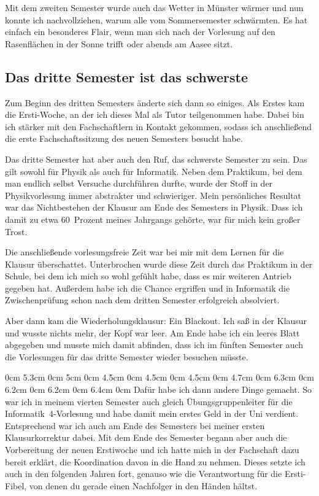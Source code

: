 \begin{multicols*}{2}
Mit dem zweiten Semester wurde auch das Wetter in Münster wärmer und nun konnte ich nachvollziehen, warum alle vom Sommersemester schwärmten. Es hat einfach ein besonderes Flair, wenn man sich nach der Vorlesung auf den Rasenflächen in der Sonne trifft oder abends am Aasee sitzt.

\subsection*{Das dritte Semester ist das schwerste}
Zum Beginn des dritten Semesters änderte sich dann so einiges. Als Erstes kam die Ersti-Woche, an der ich dieses Mal als Tutor teilgenommen habe. Dabei bin ich stärker mit den Fachschaftlern in Kontakt gekommen, sodass ich anschließend die erste Fachschaftssitzung des neuen Semesters besucht habe.

Das dritte Semester hat aber auch den Ruf, das schwerste Semester zu sein. Das gilt sowohl für Physik als auch für Informatik. Neben dem Praktikum, bei dem man endlich selbst Versuche durchführen durfte, wurde der Stoff in der Physikvorlesung immer abstrakter und schwieriger. Mein persönliches Resultat war das Nichtbestehen der Klausur am Ende des Semesters in Physik. Dass ich damit zu etwa 60~Prozent meines Jahrgangs gehörte, war für mich kein großer Trost.

Die anschließende vorlesungsfreie Zeit war bei mir mit dem Lernen für die Klausur überschattet. Unterbrochen wurde diese Zeit durch das Praktikum in der Schule, bei dem ich mich so wohl gefühlt habe, dass es mir weiteren Antrieb gegeben hat. Außerdem habe ich die Chance ergriffen und in Informatik die Zwischenprüfung schon nach dem dritten Semester erfolgreich absolviert.

Aber dann kam die Wiederholungsklausur: Ein Blackout. Ich saß in der Klausur und wusste nichts mehr, der Kopf war leer. Am Ende habe ich ein leeres Blatt abgegeben und musste mich damit abfinden, dass ich im fünften Semester auch die Vorlesungen für das dritte Semester wieder besuchen müsste.

0cm \columnwidth
0cm \columnwidth
0cm \columnwidth
0cm \columnwidth
0cm \columnwidth
0cm \columnwidth
0cm 5.3cm
0cm 5cm
0cm 4.5cm
0cm 4.5cm
0cm 4.5cm
0cm 4.7cm
0cm 6.3cm
0cm 6.2cm
0cm 6.2cm
0cm 6.4cm
0cm \columnwidth
Dafür habe ich dann andere Dinge gemacht. So war ich in meinem vierten Semester auch gleich Übungsgruppenleiter für die Informatik~4-Vorlesung und habe damit mein erstes Geld in der Uni verdient. Entsprechend war ich auch am Ende des Semesters bei meiner ersten Klausurkorrektur dabei. Mit dem Ende des Semester begann aber auch die Vorbereitung der neuen Erstiwoche und ich hatte mich in der Fachschaft dazu bereit erklärt, die Koordination davon in die Hand zu nehmen. Dieses setzte ich auch in den folgenden Jahren fort, genauso wie die Verantwortung für die Ersti-Fibel, von denen du gerade einen Nachfolger in den Händen hältst.


\end{multicols*}
